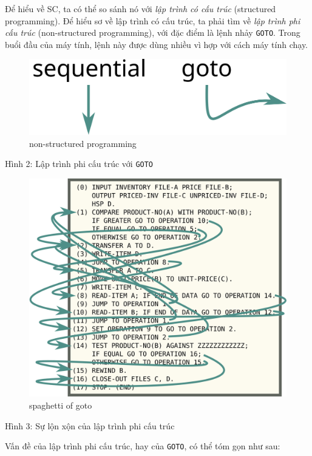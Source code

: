 Để hiểu về SC, ta có thể so sánh nó với \emph{lập trình có cấu trúc}
(structured programming). Để hiểu sơ về lập trình có cấu trúc, ta phải
tìm về \emph{lập trình phi cấu trúc} (non-structured programming), với
đặc điểm là lệnh nhảy \texttt{GOTO}. Trong buổi đầu của máy tính, lệnh
này được dùng nhiều vì hợp với cách máy tính chạy.

\begin{figure}
  \centering
  \includegraphics{../images/sequential-and-go-to-schematic.svg}
  \caption{non-structured programming}
\end{figure}

Hình 2: Lập trình phi cấu trúc với \texttt{GOTO}

\begin{figure}
  \centering
  \includegraphics{../images/flow-matic-4.svg}
  \caption{spaghetti of goto}
\end{figure}

Hình 3: Sự lộn xộn của lập trình phi cấu trúc

Vấn đề của lập trình phi cấu trúc, hay của \texttt{GOTO}, có thể tóm gọn
như sau:

